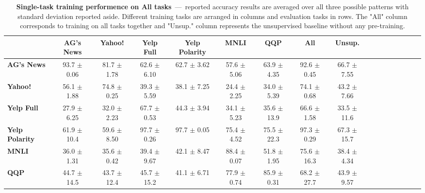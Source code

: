 \begin{table*}[h]
	\centering
	\fontsize{9}{13}
	\selectfont
	\begin{tabular*}{\textwidth}{l@{\extracolsep{\fill}}cccccccccccccccc}
		\toprule
		& \textbf{AG's News}    & \textbf{Yahoo!}    & \textbf{Yelp Full}    & \textbf{Yelp Polarity}    & \textbf{MNLI}    & \textbf{QQP}    & \textbf{All}    & \textbf{Unsup.}    \\ \hline
		\textbf{AG's News}        & 93.7   \tiny$\pm$ 0.06      & 81.7   \tiny$\pm$ 1.78      & 62.6      \tiny$\pm$ 6.10      & 62.7          \tiny$\pm$ 3.62      & 57.6 \tiny$\pm$ 5.06      & 63.9 \tiny$\pm$ 4.35      & 92.6 \tiny$\pm$ 0.45      & 66.7   \tiny$\pm$ 7.55      \\
		\textbf{Yahoo!}         & 56.1    \tiny$\pm$ 1.88      & 74.8   \tiny$\pm$ 0.25      & 39.3       \tiny$\pm$ 5.59      & 38.1           \tiny$\pm$ 7.25      & 24.4  \tiny$\pm$ 2.25      & 34.0 \tiny$\pm$ 5.39      & 74.1 \tiny$\pm$ 0.68      & 43.2   \tiny$\pm$ 7.66      \\
		\textbf{Yelp Full}     & 27.9    \tiny$\pm$ 6.25      & 32.0   \tiny$\pm$ 2.23      & 67.7       \tiny$\pm$ 0.53      & 44.3           \tiny$\pm$ 3.94      & 34.1  \tiny$\pm$ 5.23      & 35.6 \tiny$\pm$ 13.9      & 66.6 \tiny$\pm$ 1.58      & 33.5   \tiny$\pm$ 11.6      \\
		\textbf{Yelp Polarity} & 61.9    \tiny$\pm$ 10.4      & 59.6   \tiny$\pm$ 8.50      & 97.7       \tiny$\pm$ 0.26      & 97.7           \tiny$\pm$ 0.05      & 75.4  \tiny$\pm$ 4.52      & 75.5 \tiny$\pm$ 22.3      & 97.3 \tiny$\pm$ 0.29      & 67.3   \tiny$\pm$ 15.7      \\
		\textbf{MNLI}          & 36.0    \tiny$\pm$ 1.31      & 35.6   \tiny$\pm$ 0.42      & 39.4       \tiny$\pm$ 9.67      & 42.1           \tiny$\pm$ 8.47      & 88.4  \tiny$\pm$ 0.07      & 51.8 \tiny$\pm$ 1.95      & 75.6 \tiny$\pm$ 16.3      & 38.4   \tiny$\pm$ 4.34      \\
		\textbf{QQP}           & 44.7    \tiny$\pm$ 14.5      & 43.7   \tiny$\pm$ 12.4      & 45.7       \tiny$\pm$ 15.2      & 41.1           \tiny$\pm$ 6.71      & 77.9  \tiny$\pm$ 0.74      & 85.9 \tiny$\pm$ 0.31      & 68.2 \tiny$\pm$ 27.7      & 43.9   \tiny$\pm$ 9.57      \\ \bottomrule
	\end{tabular*}
	\caption{\textbf{Single-task training performence on All tasks}~---~reported accuracy results are averaged over all three possible patterns with standard deviation reported aside. Different training tasks are arranged in columns and evaluation tasks in rows. The "All" column corresponds to training on all tasks together and "Unsup." column represents the unsupervised baseline without any pre-training.}\label{tab:single-on-train-set-summary}
\end{table*}
